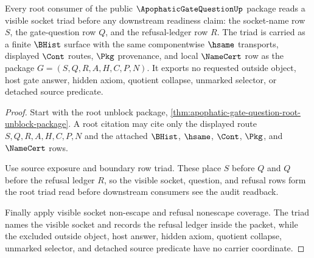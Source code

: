 \begin{theorem}
\label{thm:apophatic-gate-question-root-visible-socket-triad}
Every root consumer of the public $\ApophaticGateQuestionUp$ package reads a visible socket triad before any downstream readiness claim: the socket-name row $S$, the gate-question row $Q$, and the refusal-ledger row $R$. The triad is carried as a finite $\BHist$ surface with the same componentwise $\hsame$ transports, displayed $\Cont$ routes, $\Pkg$ provenance, and local $\NameCert$ row as the package $G=(S,Q,R,A,H,C,P,N)$. It exports no requested outside object, host gate answer, hidden axiom, quotient collapse, unmarked selector, or detached source predicate.
\end{theorem}
\begin{proof}
Start with the root unblock package, \autoref{thm:apophatic-gate-question-root-unblock-package}. A root citation may cite only the displayed route $S,Q,R,A,H,C,P,N$ and the attached $\BHist$, $\hsame$, $\Cont$, $\Pkg$, and $\NameCert$ rows.

Use source exposure and boundary row triad. These place $S$ before $Q$ and $Q$ before the refusal ledger $R$, so the visible socket, question, and refusal rows form the root triad read before downstream consumers see the audit readback.

Finally apply visible socket non-escape and refusal nonescape coverage. The triad names the visible socket and records the refusal ledger inside the packet, while the excluded outside object, host answer, hidden axiom, quotient collapse, unmarked selector, and detached source predicate have no carrier coordinate.
\end{proof}

